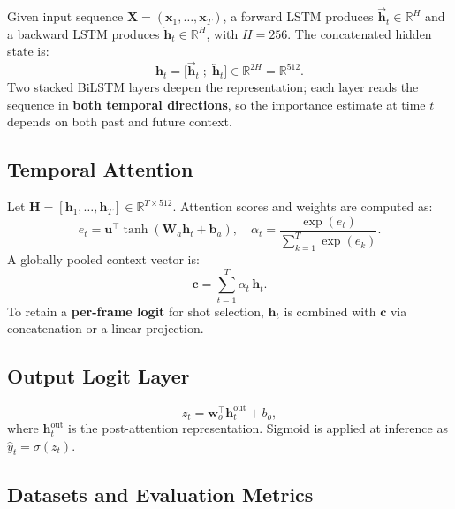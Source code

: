 \documentclass[10pt,conference]{IEEEtran}
\begin{document}
Given input sequence $\mathbf{X} = (\mathbf{x}_1,\dots,\mathbf{x}_T)$, a
forward LSTM produces $\overrightarrow{\mathbf{h}}_t \in \mathbb{R}^{H}$ and a
backward LSTM produces $\overleftarrow{\mathbf{h}}_t \in \mathbb{R}^{H}$,
with $H = 256$. The concatenated hidden state is:
\begin{equation}
  \mathbf{h}_t = \bigl[\overrightarrow{\mathbf{h}}_t \;;\;
                       \overleftarrow{\mathbf{h}}_t\bigr]
               \in \mathbb{R}^{2H} = \mathbb{R}^{512}.
\end{equation}
Two stacked BiLSTM layers deepen the representation; each layer reads the
sequence in \textbf{both temporal directions}, so the importance estimate at
time $t$ depends on both past and future context.

\subsection{Temporal Attention}

Let $\mathbf{H} = [\mathbf{h}_1,\dots,\mathbf{h}_T] \in \mathbb{R}^{T \times 512}$.
Attention scores and weights are computed as:
\begin{equation}
  e_t = \mathbf{u}^\top \tanh(\mathbf{W}_a \mathbf{h}_t + \mathbf{b}_a),
  \quad
  \alpha_t = \frac{\exp(e_t)}{\sum_{k=1}^{T}\exp(e_k)}.
\end{equation}
A globally pooled context vector is:
\begin{equation}
  \mathbf{c} = \sum_{t=1}^{T} \alpha_t\, \mathbf{h}_t.
\end{equation}
To retain a \textbf{per-frame logit} for shot selection, $\mathbf{h}_t$ is
combined with $\mathbf{c}$ via concatenation or a linear projection.

\subsection{Output Logit Layer}

\begin{equation}
  z_t = \mathbf{w}_o^\top \mathbf{h}_t^{\mathrm{out}} + b_o,
\end{equation}
where $\mathbf{h}_t^{\mathrm{out}}$ is the post-attention representation.
Sigmoid is applied at inference as $\hat{y}_t = \sigma(z_t)$.

\subsection{Datasets and Evaluation Metrics}
\end{document}
